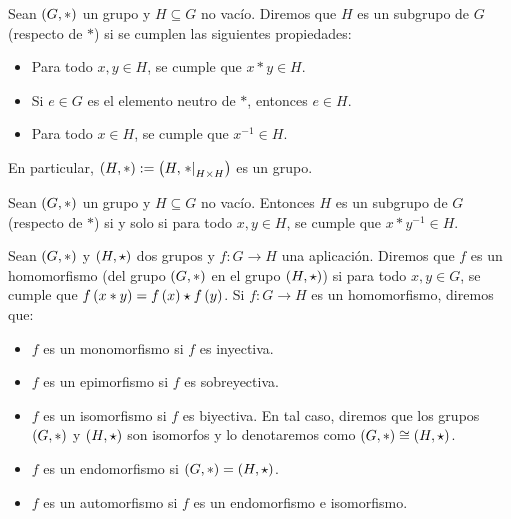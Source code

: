 \begin{definition}
  \rm Sean $\left(G,\ast\right)$ un grupo y $H\subseteq G$ no vacío. Diremos que $H$ es un subgrupo de $G$ (respecto de $\ast$) si se cumplen las siguientes propiedades:

  \begin{itemize}
    \item[1.] Para todo $x,y\in H$, se cumple que $x\ast y\in H$.
    \item[2.] Si $e\in G$ es el elemento neutro de $\ast$, entonces $e\in H$.
    \item[3.] Para todo $x\in H$, se cumple que $x^{-1}\in H$.
  \end{itemize}

  En particular, $\left(H,\ast\right):=\left(H,\left.\ast\right|_{H\times H}\right)$ es un grupo.
\end{definition}

\begin{theorem}
  \rm Sean $\left(G,\ast\right)$ un grupo y $H\subseteq G$ no vacío. Entonces $H$ es un subgrupo de $G$ (respecto de $\ast$) si y solo si para todo $x,y\in H$, se cumple que $x\ast y^{-1}\in H$.
\end{theorem}

\begin{definition}
  \rm Sean $\left(G,\ast\right)$ y $\left(H,\star\right)$ dos grupos y $f:G\rightarrow H$ una aplicación. Diremos que $f$ es un homomorfismo (del grupo $\left(G,\ast\right)$ en el grupo $\left(H,\star\right)$) si para todo $x,y\in G$, se cumple que $f\left(x\ast y\right)=f\left(x\right)\star f\left(y\right)$. Si $f:G\rightarrow H$ es un homomorfismo, diremos que:

  \begin{itemize}
    \item $f$ es un monomorfismo si $f$ es inyectiva.
    \item $f$ es un epimorfismo si $f$ es sobreyectiva.
    \item $f$ es un isomorfismo si $f$ es biyectiva. En tal caso, diremos que los grupos $\left(G,\ast\right)$ y $\left(H,\star\right)$ son isomorfos y lo denotaremos como $\left(G,\ast\right)\cong\left(H,\star\right)$.
    \item $f$ es un endomorfismo si $\left(G,\ast\right)=\left(H,\star\right)$.
    \item $f$ es un automorfismo si $f$ es un endomorfismo e isomorfismo.
  \end{itemize}
\end{definition}

